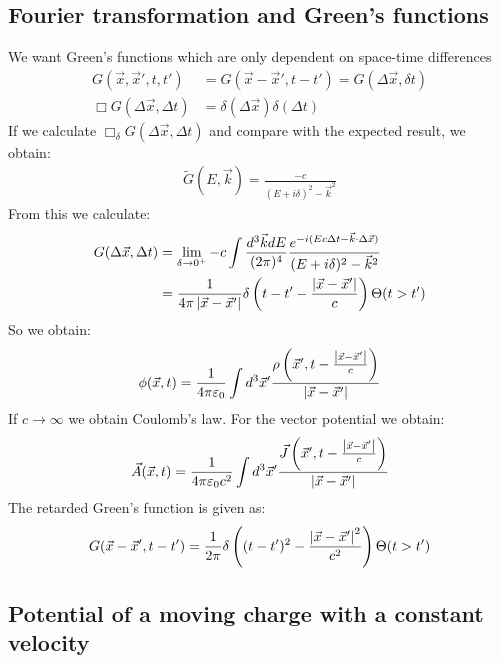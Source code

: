 \subsection{Fourier transformation and Green's functions}

We want Green's functions which are only dependent on space-time differences
\begin{align*}
    G(\vec{x},\vec{x}',t,t') &= G(\vec{x} - \vec{x}' , t - t')
    = G(\Delta \vec{x} , \delta t)
    \\
    \Box G(\Delta \vec{x},\Delta t) &= \delta(\Delta \vec{x}) \delta(\Delta t)
\end{align*}
If we calculate $\Box_\delta G(\Delta \vec{x},\Delta t)$ and compare with
the expected result, we obtain:
\begin{align*}
    \tilde{G}(E,\vec{k}) = \frac{-c}{(E + i \delta)^2 - \vec{k}^2}
\end{align*}
From this we calculate:
\begin{align*}
    G(\Delta \vec{x} , \Delta t) &= \lim\limits_{\delta \rightarrow 0^+}
        - c \int \frac{d^3 \vec{k} dE}{(2 \pi)^4} \frac{e^{-i (E c \Delta t - \vec{k} \cdot \Delta \vec{x})}}{(E + i \delta)^2 - \vec{k}^2}
    \\
    &= \frac{1}{4 \pi \left\vert \vec{x} - \vec{x}' \right\vert} \delta \left( t - t' - \frac{\left\vert \vec{x} - \vec{x}' \right\vert}{c} \right) \Theta(t>t')
\end{align*}
So we obtain:
\begin{align*}
    \phi(\vec{x},t) = \frac{1}{4 \pi \varepsilon_0} \int d^3 \vec{x}'
        \frac{\rho \left( \vec{x}' , t - \frac{\left\vert \vec{x} - \vec{x}' \right\vert}{c} \right)}{\left\vert \vec{x} - \vec{x}' \right\vert}
\end{align*}
If $c \rightarrow \infty$ we obtain Coulomb's law.
For the vector potential we obtain:
\begin{align*}
    \vec{A} (\vec{x},t) = \frac{1}{4 \pi \varepsilon_0 c^2} \int d^3 \vec{x}'
        \frac{\vec{J}\left( \vec{x}' , t - \frac{\left\vert \vec{x} - \vec{x}' \right\vert}{c} \right)}{\left\vert \vec{x} - \vec{x}' \right\vert}
\end{align*}
The retarded Green's function is given as:
\begin{align*}
    G(\vec{x} - \vec{x}' , t - t') = \frac{1}{2 \pi} \delta
    \left( (t - t')^2 - \frac{\left\vert \vec{x} - \vec{x}' \right\vert^2}{c^2} \right) \Theta(t>t')
\end{align*}

\subsection{Potential of a moving charge with a constant velocity}

